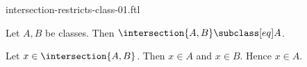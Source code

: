 \documentclass{article}
\begin{document}
\begin{smodule}[creators={Marcel Schütz}]{intersection-restricts-class-01.ftl}

  \begin{fproposition*}[label=8287827479494656]
    Let $A, B$ be classes.
    Then $\intersection{A,B} \subclass[eq] A$.
  \end{fproposition*}
  \begin{fproof}
    Let $x \in \intersection{A,B}$.
    Then $x \in A$ and $x \in B$.
    Hence $x \in A$.
  \end{fproof}
\end{smodule}
\end{document}
